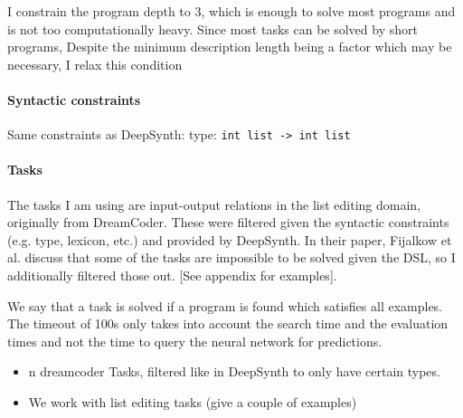 
I constrain the program depth to 3, which is enough to solve most programs and is not too computationally heavy.
Since most tasks can be solved by short programs, 
Despite the minimum description length being a factor which may be necessary, I relax this condition

\paragraph{Syntactic constraints}
Same constraints as DeepSynth:
type: \texttt{int list -> int list}


\paragraph{Tasks}

The tasks I am using are input-output relations in the list editing domain, originally from DreamCoder. These were filtered given the syntactic constraints (e.g. type, lexicon, etc.) and provided by DeepSynth. In their paper, Fijalkow et al. discuss that some of the tasks are impossible to be solved given the DSL, so I additionally filtered those out.
[See appendix for examples]. 

We say that a task is solved if a program is found which satisfies all examples. The timeout of 100s only takes into account the search time and the evaluation times and not the time to query the neural network for predictions.

\begin{itemize}
    \item n dreamcoder Tasks, filtered like in DeepSynth to only have certain types.
    \item We work with list editing tasks (give a couple of examples)
\end{itemize}


